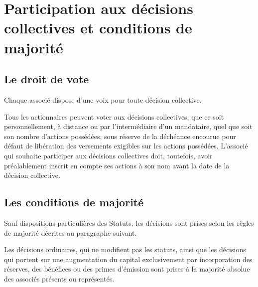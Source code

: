 \documentclass[a4paper,12pt]{report}
\begin{document}
%

\section{Participation aux décisions collectives et conditions de majorité}
\subsection{Le droit de vote}
Chaque associé dispose d'une voix pour toute décision collective.

Tous les actionnaires peuvent voter aux décisions collectives, que ce soit personnellement, à distance ou par l'intermédiaire d'un mandataire, quel que soit son nombre d'actions possédées, sous réserve de la déchéance encourue pour défaut de libération des versements exigibles sur les actions possédées. L'associé qui souhaite participer aux décisions collectives doit, toutefois, avoir préalablement inscrit en compte ses actions à son nom avant la date de la décision collective.

\subsection{Les conditions de majorité}
Sauf dispositions particulières des Statuts, les décisions sont prises selon les règles de majorité décrites au paragraphe suivant.

Les décisions ordinaires, qui ne modifient pas les statuts, ainsi que les décisions qui portent sur une augmentation du capital exclusivement par incorporation des réserves, des bénéfices ou des primes d'émission sont prises à la majorité absolue des associés présents ou représentés.
\end{document}

